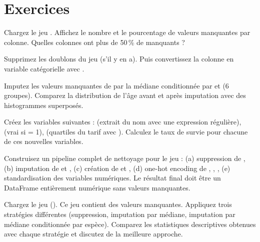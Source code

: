 \section{Exercices}

\begin{exercice}[$\star$]
Chargez le jeu . Affichez le nombre et le pourcentage de valeurs manquantes par colonne. Quelles colonnes ont plus de 50\,\% de manquants ?
\end{exercice}

\begin{exercice}[$\star$]
Supprimez les doublons du jeu  (s'il y en a). Puis convertissez la colonne  en variable cat\'egorielle avec .
\end{exercice}

\begin{exercice}[$\star\star$]
Imputez les valeurs manquantes de  par la m\'ediane conditionn\'ee par  et  (6 groupes). Comparez la distribution de l'\^age avant et apr\`es imputation avec des histogrammes superpos\'es.
\end{exercice}

\begin{exercice}[$\star\star$]
Cr\'eez les variables suivantes :  (extrait du nom avec une expression r\'eguli\`ere),  (vrai si  = 1),  (quartiles du tarif avec ). Calculez le taux de survie pour chacune de ces nouvelles variables.
\end{exercice}

\begin{exercice}[$\star\star\star$]
Construisez un pipeline complet de nettoyage pour le jeu  : (a) suppression de , (b) imputation de  et , (c) cr\'eation de  et , (d) one-hot encoding de , , , (e) standardisation des variables num\'eriques. Le r\'esultat final doit \^etre un DataFrame enti\`erement num\'erique sans valeurs manquantes.
\end{exercice}

\begin{exercice}[$\star\star\star$]
Chargez le jeu  (). Ce jeu contient des valeurs manquantes. Appliquez trois strat\'egies diff\'erentes (suppression, imputation par m\'ediane, imputation par m\'ediane conditionn\'ee par esp\`ece). Comparez les statistiques descriptives obtenues avec chaque strat\'egie et discutez de la meilleure approche.
\end{exercice}

